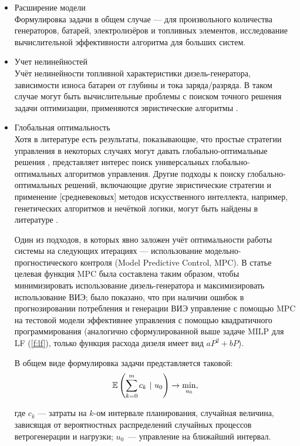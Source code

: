\begin{itemize}
    \item Расширение модели\\
    Формулировка задачи в общем случае --- для произвольного количества генераторов, батарей, электролизёров и топливных элементов, исследование вычислительной эффективности алгоритма для больших систем.

    \item Учет нелинейностей \\
    Учёт нелинейности топливной характеристики дизель-генератора,
    зависимости износа батареи от глубины и тока заряда/разряда.
    В таком случае могут быть вычислительные проблемы с поиском точного решения задачи оптимизации, применяются эвристические алгоритмы \cite{Sufyan2019}.
    
    \item Глобальная оптимальность\\
    Хотя в литературе есть результаты, показывающие, что простые стратегии управления в некоторых случаях могут давать глобально-оптимальные решения \cite{Barley1996}, представляет интерес поиск универсальных глобально-оптимальных алгоритмов управления.
    Другие подходы к поиску глобально-оптимальных решений, включающие другие эвристические стратегии и применение [средневековых] методов искусственного интеллекта, например, генетических алгоритмов и нечёткой логики, могут быть найдены в литературе \cite{Olatomiwa2016}.
    
    Один из подходов, в которых явно заложен учёт оптимальности работы системы на следующих итерациях --- использование модельно-прогностического контроля (Model Predictive Control, MPC).
    В статье \cite{Tazvinga2014} целевая функция MPC была составлена таким образом, чтобы минимизировать использование дизель-генератора и максимизировать использование ВИЭ; 
    было показано, что при наличии ошибок в прогнозировании потребления и генерации ВИЭ управление с помощью MPC на тестовой модели эффективнее управления с помощью квадратичного программирования (аналогично сформулированной выше задаче MILP для LF (\ref{f:lf}), только функция расхода дизеля имеет вид $aP^2 + bP$).
    
    
    В общем виде формулировка задачи представляется таковой:
    \begin{equation}
        \operatorname*{\mathbb{E}}\left( \sum_{k=0}^m c_k ~\vert~ u_0 \right) \rightarrow \min\limits_{u_0},
    \end{equation}
    
    где $c_k$ --- затраты на $k$-ом интервале планирования, случайная величина, зависящая от вероятностных распределений случайных процессов ветрогенерации и нагрузки; $u_0$~--- управление на ближайший интервал.
    

\end{itemize}
